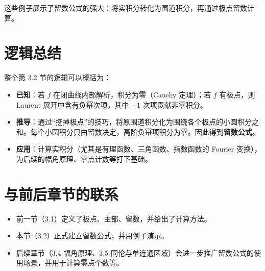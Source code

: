 \documentclass[UTF8]{ctexart}
\numberwithin{equation}{section}
\begin{document}
这些例子展示了留数公式的强大：将实积分转化为围道积分，再通过极点留数计算。

\section{逻辑总结}
整个第 3.2 节的逻辑可以概括为：
\begin{itemize}
\item \textbf{已知}：若 \(f\) 在闭曲线内部解析，积分为零（Cauchy 定理）；若 \(f\) 有极点，则 Laurent 展开中含有负幂次项，其中 \(-1\) 次项贡献非零积分。
\item \textbf{推导}：通过“挖掉极点”的技巧，将原围道积分化为围绕各个极点的小圆积分之和。每个小圆积分只由留数决定，高阶负幂项积分为零。因此得到\textbf{留数公式}。
\item \textbf{应用}：计算实积分（尤其是有理函数、三角函数、指数函数的 Fourier 变换），为后续的幅角原理、零点计数等打下基础。
\end{itemize}

\section{与前后章节的联系}
\begin{itemize}
\item 前一节（3.1）定义了极点、主部、留数，并给出了计算方法。
\item 本节（3.2）正式建立留数公式，并用例子演示。
\item 后续章节（3.4 幅角原理、3.5 同伦与单连通区域）会进一步推广留数公式的使用场景，并用于计算零点个数等。
\end{itemize}
\end{document}
